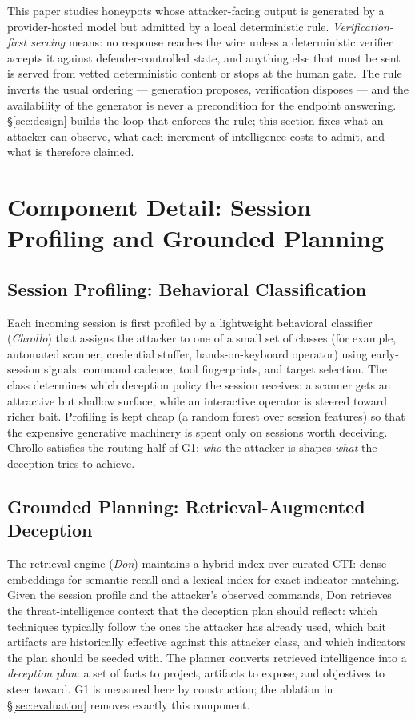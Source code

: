 This paper studies honeypots whose attacker-facing output is generated
by a provider-hosted model but admitted by a local deterministic rule.
\emph{Verification-first serving} means: no response reaches the wire
unless a deterministic verifier accepts it against defender-controlled
state, and anything else that must be sent is served from vetted
deterministic content or stops at the human gate. The rule inverts the
usual ordering --- generation proposes, verification disposes ---
and the availability of the generator is never a precondition for the
endpoint answering. \S\ref{sec:design} builds the loop that enforces
the rule; this section fixes what an attacker can observe, what each
increment of intelligence costs to admit, and what is therefore
claimed.


\section{Component Detail: Session Profiling and Grounded Planning}

\subsection{Session Profiling: Behavioral Classification}
\label{sec:chrollo}
Each incoming session is first profiled by a lightweight behavioral
classifier (\emph{Chrollo}) that assigns the attacker to one of a small
set of classes (for example, automated scanner, credential stuffer,
hands-on-keyboard operator) using early-session signals: command cadence,
tool fingerprints, and target selection. The class determines which
deception policy the session receives: a scanner gets an attractive but
shallow surface, while an interactive operator is steered toward richer
bait. Profiling is kept cheap (a random forest over session features)
so that the expensive generative machinery is spent only on sessions
worth deceiving. Chrollo
satisfies the routing half of G1: \emph{who} the attacker is shapes
\emph{what} the deception tries to achieve.

\subsection{Grounded Planning: Retrieval-Augmented Deception}
\label{sec:don}
The retrieval engine (\emph{Don}) maintains a hybrid index over curated
CTI: dense embeddings for semantic recall and a lexical index for exact
indicator matching. Given the session profile and the attacker's observed
commands, Don retrieves the threat-intelligence context that the deception
plan should reflect: which techniques typically follow the ones the
attacker has already used, which bait artifacts are historically
effective
against this attacker class, and which indicators the plan should
be
seeded with. The planner converts retrieved intelligence into a
\emph{deception plan}: a set of facts to project, artifacts to expose, and
objectives to steer toward. G1 is measured here by construction; the
ablation in \S\ref{sec:evaluation} removes exactly this component.

